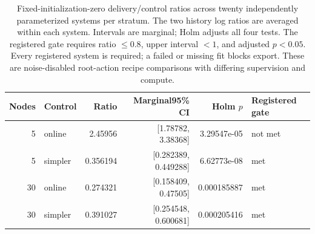 \begin{table}[ht]
\centering\small
\begin{tabular}{rlrrrl}
\toprule
Nodes & Control & Ratio & Marginal95\% CI & Holm $p$ & Registered gate\\
\midrule
5 & online & 2.45956 & [1.78782, 3.38368] & 3.29547e-05 & not met\\
5 & simpler & 0.356194 & [0.282389, 0.449288] & 6.62773e-08 & met\\
30 & online & 0.274321 & [0.158409, 0.47505] & 0.000185887 & met\\
30 & simpler & 0.391027 & [0.254548, 0.600681] & 0.000205416 & met\\
\bottomrule
\end{tabular}
\caption{Fixed-initialization-zero delivery/control ratios across twenty independently parameterized systems per stratum. The two history log ratios are averaged within each system. Intervals are marginal; Holm adjusts all four tests. The registered gate requires ratio $\leq0.8$, upper interval $<1$, and adjusted $p<0.05$. Every registered system is required; a failed or missing fit blocks export. These are noise-disabled root-action recipe comparisons with differing supervision and compute.}
\label{tab:prospective-primary}
\end{table}
